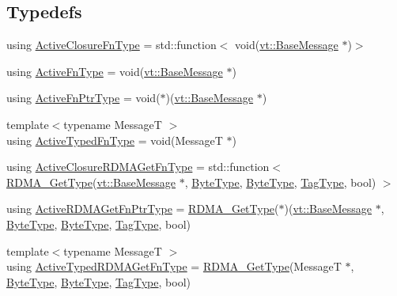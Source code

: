 \subsection*{Typedefs}
\begin{DoxyCompactItemize}
\item 
using \hyperlink{namespacevt_a2a06c34cafcd511828f16cbf1476b924}{Active\+Closure\+Fn\+Type} = std\+::function$<$ void(\hyperlink{namespacevt_ac34f95a5e2b8109b55bfba52b074443d}{vt\+::\+Base\+Message} $\ast$)$>$
\item 
using \hyperlink{namespacevt_a546925d221208866b866b2edf8f24d04}{Active\+Fn\+Type} = void(\hyperlink{namespacevt_ac34f95a5e2b8109b55bfba52b074443d}{vt\+::\+Base\+Message} $\ast$)
\item 
using \hyperlink{namespacevt_a70e19bd64d031e65083c2125b2c65426}{Active\+Fn\+Ptr\+Type} = void($\ast$)(\hyperlink{namespacevt_ac34f95a5e2b8109b55bfba52b074443d}{vt\+::\+Base\+Message} $\ast$)
\item 
{\footnotesize template$<$typename MessageT $>$ }\\using \hyperlink{namespacevt_a54eefd5373739c7365058b0d22fea6e2}{Active\+Typed\+Fn\+Type} = void(MessageT $\ast$)
\item 
using \hyperlink{namespacevt_aac79af69904337145f4d3d441802c932}{Active\+Closure\+R\+D\+M\+A\+Get\+Fn\+Type} = std\+::function$<$ \hyperlink{namespacevt_a1cab7f4860f65a49ad2c042d6240f288}{R\+D\+M\+A\+\_\+\+Get\+Type}(\hyperlink{namespacevt_ac34f95a5e2b8109b55bfba52b074443d}{vt\+::\+Base\+Message} $\ast$, \hyperlink{namespacevt_aab8d55968084610ce3b17057981e9300}{Byte\+Type}, \hyperlink{namespacevt_aab8d55968084610ce3b17057981e9300}{Byte\+Type}, \hyperlink{namespacevt_a84ab281dae04a52a4b243d6bf62d0e52}{Tag\+Type}, bool) $>$
\item 
using \hyperlink{namespacevt_ae4fbf97da623bfcd09ee8379de756257}{Active\+R\+D\+M\+A\+Get\+Fn\+Ptr\+Type} = \hyperlink{namespacevt_a1cab7f4860f65a49ad2c042d6240f288}{R\+D\+M\+A\+\_\+\+Get\+Type}($\ast$)(\hyperlink{namespacevt_ac34f95a5e2b8109b55bfba52b074443d}{vt\+::\+Base\+Message} $\ast$, \hyperlink{namespacevt_aab8d55968084610ce3b17057981e9300}{Byte\+Type}, \hyperlink{namespacevt_aab8d55968084610ce3b17057981e9300}{Byte\+Type}, \hyperlink{namespacevt_a84ab281dae04a52a4b243d6bf62d0e52}{Tag\+Type}, bool)
\item 
{\footnotesize template$<$typename MessageT $>$ }\\using \hyperlink{namespacevt_add83fe11410931719f6543a575acfe87}{Active\+Typed\+R\+D\+M\+A\+Get\+Fn\+Type} = \hyperlink{namespacevt_a1cab7f4860f65a49ad2c042d6240f288}{R\+D\+M\+A\+\_\+\+Get\+Type}(MessageT $\ast$, \hyperlink{namespacevt_aab8d55968084610ce3b17057981e9300}{Byte\+Type}, \hyperlink{namespacevt_aab8d55968084610ce3b17057981e9300}{Byte\+Type}, \hyperlink{namespacevt_a84ab281dae04a52a4b243d6bf62d0e52}{Tag\+Type}, bool)

\end{DoxyCompactItemize}
